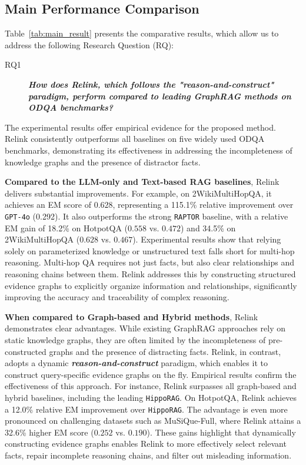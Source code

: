 \documentclass[letterpaper]{article} %
\begin{document}
\subsection{Main Performance Comparison}
Table~\ref{tab:main_result} presents the comparative results, which allow us to address the following Research Question (RQ):
\begin{description}
    \item[RQ1] \textbf{\textit{How does Relink, which follows the "reason-and-construct" paradigm, perform compared to leading GraphRAG methods on ODQA benchmarks?}}
\end{description}
The experimental results offer empirical evidence for the proposed method. Relink consistently outperforms all baselines on five widely used ODQA benchmarks, demonstrating its effectiveness in addressing the incompleteness of knowledge graphs and the presence of distractor facts.

\textbf{Compared to the LLM-only and Text-based RAG baselines}, Relink delivers substantial improvements. For example, on 2WikiMultiHopQA, it achieves an EM score of $0.628$, representing a 115.1\% relative improvement over \texttt{GPT-4o} (0.292).
 It also outperforms the strong \texttt{RAPTOR} baseline, with a relative EM gain of 18.2\% on HotpotQA ($0.558$ vs. $0.472$) and 34.5\% on 2WikiMultiHopQA ($0.628$ vs. $0.467$).
Experimental results show that relying solely on parameterized knowledge or unstructured text falls short for multi-hop reasoning. Multi-hop QA requires not just facts, but also clear relationships and reasoning chains between them. Relink addresses this by constructing structured evidence graphs to explicitly organize information and relationships, significantly improving the accuracy and traceability of complex reasoning.


\textbf{When compared to Graph-based and Hybrid methods}, Relink demonstrates clear advantages. While existing GraphRAG approaches rely on static knowledge graphs, they are often limited by the incompleteness of pre-constructed graphs and the presence of distracting facts. Relink, in contrast, adopts a dynamic \textbf{\textit{reason-and-construct}} paradigm, which enables it to construct query-specific evidence graphs on the fly. 
%
Empirical results confirm the effectiveness of this approach. For instance, Relink surpasses all graph-based and hybrid baselines, including the leading \texttt{HippoRAG}. On HotpotQA, Relink achieves a 12.0\% relative EM improvement over \texttt{HippoRAG}. The advantage is even more pronounced on challenging datasets such as MuSiQue-Full, where Relink attains a 32.6\% higher EM score ($0.252$ vs. $0.190$). These gains highlight that dynamically constructing evidence graphs enables Relink to more effectively select relevant facts, repair incomplete reasoning chains, and filter out misleading information. 
\end{document}
